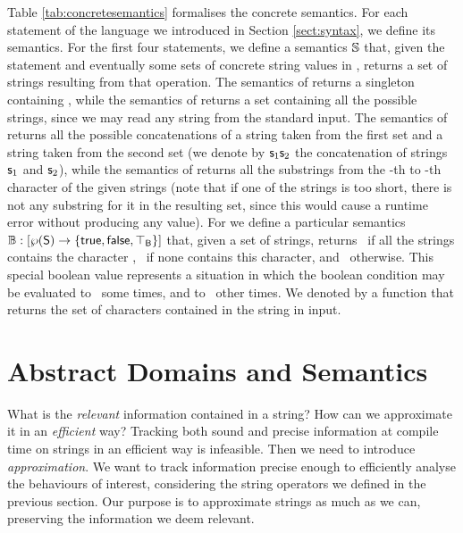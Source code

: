 \documentclass[orivec]{llncs}
\begin{document}
 
 
 
Table \ref{tab:concretesemantics} formalises the concrete semantics. For each statement of the language we introduced in Section \ref{sect:syntax}, we define its semantics. For the first four statements, we define a semantics $\mathbb{S}$ that, given the statement and eventually some sets of concrete string values in \strings, returns a set of strings resulting from that operation. The semantics of  returns a singleton containing , while the semantics of  returns a set containing all the possible strings, since we may read any string from the standard input. The semantics of  returns all the possible concatenations of a string taken from the first set and a string taken from the second set (we denote by $\mathsf{s}_1\mathsf{s}_2$ the concatenation of strings $\mathsf{s}_1$ and $\mathsf{s}_2$), while the semantics of  returns all the substrings from the -th to -th character of the given strings (note that if one of the strings is too short, there is not any substring for it in the resulting set, since this would cause a runtime error without producing any value). For  we define a particular semantics $\mathbb{B} : [\wp(\mathsf{S}) \rightarrow\{\mathsf{true},\mathsf{false},\mathsf{\top_B}\}] $ that, given a set of strings, returns \true\ if all the strings contains the character , \false\ if none contains this character, and \booltop\ otherwise. This special boolean value represents a situation in which the boolean condition may be evaluated to \true\ some times, and to \false\ other times. We denoted by \cfunction{\charname} a function that returns the set of characters contained in the string in input.


 
 
\section{Abstract Domains and Semantics}
 
\label{sect:abstractdomain}
What is the \emph{relevant} information contained in a string? How can we approximate it in an \emph{efficient} way? Tracking both sound and precise information at compile time on strings in an efficient way is infeasible. Then we need to introduce \emph{approximation}. We want to track information precise enough to efficiently analyse the behaviours of interest, considering the string operators we defined in the previous section. Our purpose is to approximate strings as much as we can, preserving the information we deem relevant.
\end{document}
